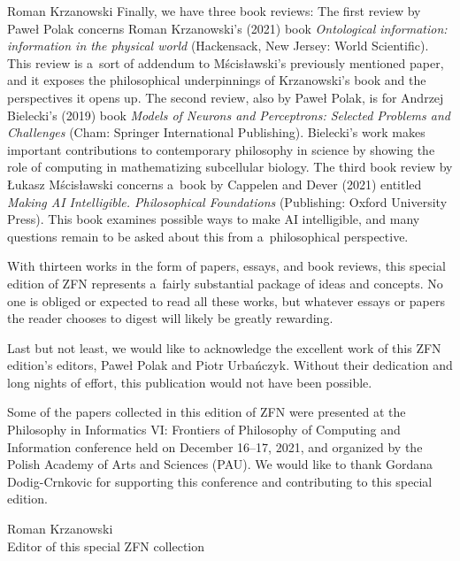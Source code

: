 \begin{editorialeng}{Roman Krzanowski}
Finally, we have three book reviews: The first review by Paweł Polak concerns Roman Krzanowski's (2021) book \textit{Ontological information: information in the physical world} (Hackensack, New Jersey: World Scientific). This review is a~sort of addendum to Mścisławski's previously mentioned paper, and it exposes the philosophical underpinnings of Krzanowski's book and the perspectives it opens up. The second review, also by Paweł Polak, is for Andrzej Bielecki's (2019) book \textit{Models of Neurons and Perceptrons: Selected Problems and Challenges} (Cham: Springer International Publishing). Bielecki's work makes important contributions to contemporary philosophy in science by showing the role of computing in mathematizing subcellular biology. The third book review by Łukasz Mścisławski concerns a~book by Cappelen and Dever (2021) entitled \textit{Making AI Intelligible. Philosophical Foundations} (Publishing: Oxford University Press). This book examines possible ways to make AI intelligible, and many questions remain to be asked about this from a~philosophical perspective.

With thirteen works in the form of papers, essays, and book reviews, this special edition of ZFN represents a~fairly substantial package of ideas and concepts. No one is obliged or expected to read all these works, but whatever essays or papers the reader chooses to digest will likely be greatly rewarding.

Last but not least, we would like to acknowledge the excellent work of this ZFN edition's editors, Paweł Polak and Piotr Urbańczyk. Without their dedication and long nights of effort, this publication would not have been possible.

Some of the papers collected in this edition of ZFN were presented at the Philosophy in Informatics VI: Frontiers of Philosophy of Computing and Information conference held on December 16–17, 2021, and organized by the Polish Academy of Arts and Sciences (PAU). We would like to thank Gordana Dodig-Crnkovic for supporting this conference and contributing to this special edition.

\begin{flushright}
Roman Krzanowski\\
Editor of this special ZFN collection
\end{flushright}

\end{editorialeng}
